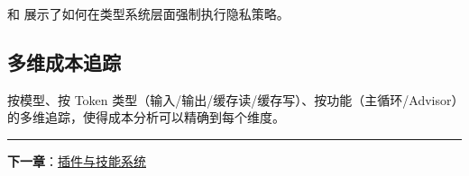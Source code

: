  和  展示了如何在类型系统层面强制执行隐私策略。

\subsection{多维成本追踪}

按模型、按 Token 类型（输入/输出/缓存读/缓存写）、按功能（主循环/Advisor）的多维追踪，使得成本分析可以精确到每个维度。

\bigskip\noindent\rule{\textwidth}{0.4pt}\bigskip

\textbf{下一章}：\href{./chapter-16-plugins-skills.md}{插件与技能系统}
